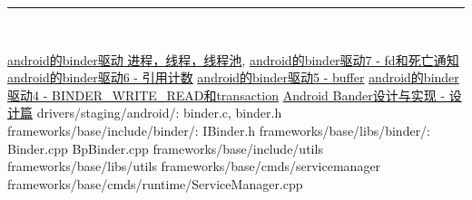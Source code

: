 \documentclass[a4paper,11pt]{article}
\begin{document}
\noindent\rule[-1ex]{\textwidth}{3pt}\\[2.0ex] 
\begin{thebibliography}{Binder}
     \href{http://blog.sina.com.cn/s/blog_69f669470100s40o.html}{android的binder驱动 进程，线程，线程池},
    \bibitem {}\href{http://www.baidubuqing.com/node/244}{android的binder驱动7 - fd和死亡通知}
    \bibitem {}\href{http://www.baidubuqing.com/node/243}{android的binder驱动6 - 引用计数}
    \bibitem {}\href{http://www.baidubuqing.com/node/242}{android的binder驱动5 - buffer}
    \bibitem {}\href{http://www.baidubuqing.com/node/241}{android的binder驱动4 - BINDER_WRITE_READ和transaction} 
     \href{http://blog.csdn.net/universus/article/details/6211589}{Android Bander设计与实现 - 设计篇}
    drivers/staging/android/: binder.c, binder.h
    frameworks/base/include/binder/: IBinder.h
    frameworks/base/libs/binder/:  Binder.cpp BpBinder.cpp
     frameworks/base/include/utils
     frameworks/base/libs/utils 
     frameworks/base/cmds/servicemanager
     frameworks/base/cmds/runtime/ServiceManager.cpp
\end{thebibliography}
\printindex

\end{document}
